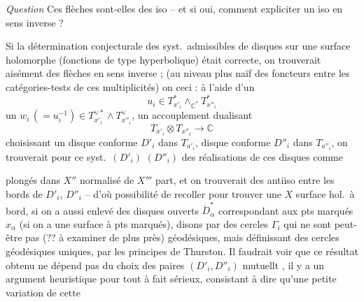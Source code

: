 \documentclass[11pt,a4paper]{article}
\begin{document}

\emph{Question} Ces flèches sont-elles des iso -- et si oui, comment
expliciter un iso en sens inverse ? 

Si la détermination conjecturale des syst.\ admissibles de disques sur une
surface holomorphe  (fonctions de type hyperbolique)
était correcte, on trouverait aisément des \struck{\ill{}} flèches en sens
inverse ; (au niveau plus naïf des foncteurs entre les catégories-tests de
ces multiplicités) on   ceci : à
l'aide d'un \struck{\ill{}}
\[
  u_i \in T^{*}_{x'_i} \wedge_{\mathbb{C}^{*}} T^{*}_{x''_i}
\]
 un
$w_i \,(= u_i^{-1}) \in T^{\vee *}_{x'_i} \wedge T^{\vee}_{x''_i}$,
  un accouplement dualisant
\[
  T_{x'_i} \otimes T_{x''_i} \longrightarrow \mathbb{C}
\]
 choisissant un \struck{\ill{}} disque conforme $D'_i$
dans $T_{a'_i}$, \struck{\ill{}}  disque conforme
 $D''_i$ dans $T_{a''_i}$, on trouverait 
pour ce syst.\ $(D'_i)$ $(D''_i)$ des réalisations de ces disques comme


plongés dans $X''$ normalisé de $X'''$ \struck{\ill{}} \ill{} part, et on
trouverait des antiiso entre les bords  de $D'_i$, $D''_i$
-- d'où possibilité de recoller pour trouver une $X$ surface hol.\ à bord,
si on a aussi enlevé des disques ouverts $\mathring{D}^{*}_{\alpha}$
correspondant aux pts marqués $x_\alpha$ (si on a une surface à pts
marqués), disons par des cercles $\Gamma_i$ qui ne sont peut-être pas (??
\struck{\ill{}} à examiner de plus près)  géodésiques, mais
définissant des cercles géodésiques uniques, par les principes de
Thurston.
Il faudrait voir que ce résultat obtenu ne dépend pas du choix des paires
$(D'_i, D''_i)$ mutuellt , il y a un argument
heuristique pour  tout à fait sérieux, consistant à dire
qu'une petite variation de cette

\end{document}
